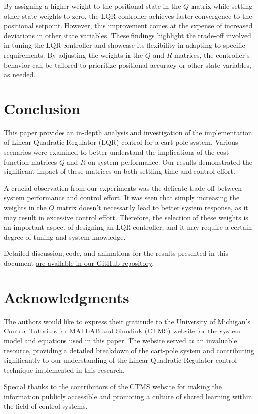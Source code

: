 \documentclass[11pt,twocolumn,twoside,lineno]{pnas-new}
\begin{document}
By assigning a higher weight to the positional state in the $Q$ matrix while setting other state weights to zero, the LQR controller achieves faster convergence to the positional setpoint. However, this improvement comes at the expense of increased deviations in other state variables. These findings highlight the trade-off involved in tuning the LQR controller and showcase its flexibility in adapting to specific requirements. By adjusting the weights in the $Q$ and $R$ matrices, the controller's behavior can be tailored to prioritize positional accuracy or other state variables, as needed.

\section{Conclusion}

This paper provides an in-depth analysis and investigation of the implementation of Linear Quadratic Regulator (LQR) control for a cart-pole system. Various scenarios were examined to better understand the implications of the cost function matrices $Q$ and $R$ on system performance. Our results demonstrated the significant impact of these matrices on both settling time and control effort.

A crucial observation from our experiments was the delicate trade-off between system performance and control effort. It was seen that simply increasing the weights in the $Q$ matrix doesn't necessarily lead to better system response, as it may result in excessive control effort. Therefore, the selection of these weights is an important aspect of designing an LQR controller, and it may require a certain degree of tuning and system knowledge.

Detailed discussion, code, and animations for the results presented in this document \href{https://github.com/sezer-muhammed/LQR-Controller-Examples}{are available in our GitHub repository}. 



\showmatmethods{} %
\section{Acknowledgments}

The authors would like to express their gratitude to the \href{https://ctms.engin.umich.edu/CTMS/index.php?example=InvertedPendulum&section=SystemModeling}{University of Michigan's Control Tutorials for MATLAB and Simulink (CTMS)} website for the system model and equations used in this paper. The website served as an invaluable resource, providing a detailed breakdown of the cart-pole system and contributing significantly to our understanding of the Linear Quadratic Regulator control technique implemented in this research.

Special thanks to the contributors of the CTMS website for making the information publicly accessible and promoting a culture of shared learning within the field of control systems.


\showacknow{} %


\end{document}
